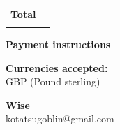 \documentclass[a4paper]{letter}
\begin{document}
\hfill \begin{tabularx}{0.2\textwidth}
{
    >{\raggedright\arraybackslash} X
    >{\raggedleft\arraybackslash} X
    }
    \bf Total & \bf \textsterling 250 \\
    [2.5ex]
    \hhline{--}
\end{tabularx}

\vspace{1 cm}

\Large\textbf{Payment instructions}\normalsize

\vspace{0.1 cm}

\textbf{Currencies accepted:}\\
GBP (Pound sterling)

\textbf{Wise}\\
kotatsugoblin@gmail.com
\end{document}
